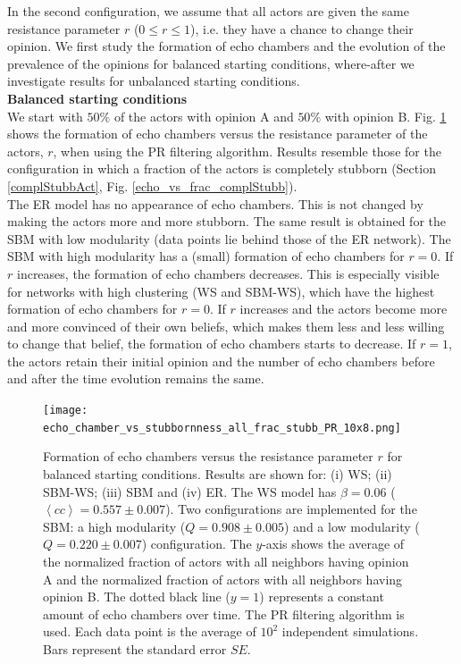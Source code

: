 \documentclass[11 pt , letterpaper , twoside , openright]{book}
\begin{document}
In the second configuration, we assume that all actors are given the same resistance parameter $r$ ($0 \leqslant r \leqslant 1$), i.e. they have a chance to change their opinion. We first study the formation of echo chambers and the evolution of the prevalence of the opinions for balanced starting conditions, where-after we investigate results for unbalanced starting conditions.\\
\newline
\textbf{Balanced starting conditions}\\
\newline
We start with $50 \%$ of the actors with opinion A and $50 \%$ with opinion B. Fig. \ref{echo_vs_all_frac_stubb_PR} shows the formation of echo chambers versus the resistance parameter of the actors, $r$, when using the PR filtering algorithm. Results resemble those for the configuration in which a fraction of the actors is completely stubborn (Section \ref{complStubbAct}, Fig. \ref{echo_vs_frac_complStubb}).\\
\newline
The ER model has no appearance of echo chambers. This is not changed by making the actors more and more stubborn. The same result is obtained for the SBM with low modularity (data points lie behind those of the ER network). The SBM with high modularity has a (small) formation of echo chambers for $r=0$. If $r$ increases, the formation of echo chambers decreases. This is especially visible for networks with high clustering (WS and SBM-WS), which have the highest formation of echo chambers for $r=0$. If $r$ increases and the actors become more and more convinced of their own beliefs, which makes them less and less willing to change that belief, the formation of echo chambers starts to decrease. If $r=1$, the actors retain their initial opinion and the number of echo chambers before and after the time evolution remains the same.

\begin{figure}[H]
	\texttt{[image: echo\_chamber\_vs\_stubbornness\_all\_frac\_stubb\_PR\_10x8.png]}
	\captionsetup{format=plain}
	\caption[Formation of echo chambers versus the resistance parameter of the actors, $r$, for balanced starting conditions. The PR filtering algorithm is used.]{Formation of echo chambers versus the resistance parameter $r$ for balanced starting conditions. Results are shown for: (i) WS; (ii) SBM-WS; (iii) SBM and (iv) ER. The WS model has $\beta = 0.06$ ($\left<cc\right> = 0.557 \pm 0.007$). Two configurations are implemented for the SBM: a high modularity ($Q = 0.908 \pm 0.005$) and a low modularity ($Q = 0.220 \pm 0.007$) configuration. The $y$-axis shows the average of the normalized fraction of actors with all neighbors having opinion A and the normalized fraction of actors with all neighbors having opinion B. The dotted black line ($y=1$) represents a constant amount of echo chambers over time. The PR filtering algorithm is used. Each data point is the average of $10^2$ independent simulations. Bars represent the standard error $SE$.}
\label{echo_vs_all_frac_stubb_PR}
\end{figure}
\end{document}

